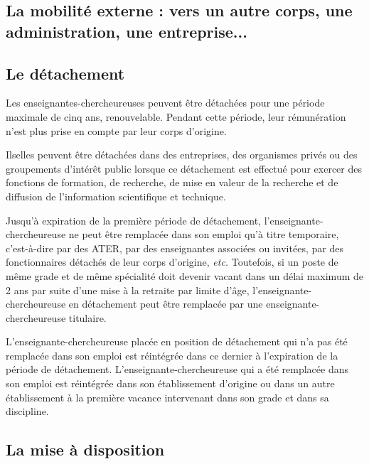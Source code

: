 \subsection{La mobilit\'e externe : vers un autre corps, une administration, une entreprise...}

\subsection*{Le d\'etachement}

Les enseignant\mp e\mp s-chercheur\mp euse\mp s peuvent \^etre d\'etach\'e\mp e\mp s pour une
p\'eriode maximale de cinq ans, renouvelable. Pendant cette p\'eriode, leur r\'emun\'eration n'est plus prise en compte par
leur corps d'origine.

Ils\mp elles peuvent \^etre d\'etach\'e\mp e\mp s dans des entreprises, des organismes
priv\'es ou des groupements d'int\'er\^et public lorsque ce
d\'etachement est effectu\'e pour exercer des fonctions de
formation, de recherche, de mise en valeur de la recherche et de
diffusion de l'information scientifique et technique.

Jusqu'\`a expiration de la premi\`ere p\'eriode de d\'etachement,
l'enseignant\mp e-chercheur\mp euse ne peut \^etre remplac\'e\mp e dans son emploi
qu'\`a titre temporaire, c'est-\`a-dire par des ATER, par des
enseignant\mp e\mp s associ\'e\mp e\mp s ou invit\'e\mp e\mp s, par des fonctionnaires
d\'etach\'es de leur corps d'origine, {\em etc.} Toutefois, si un
poste de m\^eme grade et de m\^eme sp\'ecialit\'e doit devenir
vacant dans un d\'elai maximum de 2 ans par suite d'une mise \`a
la retraite par limite d'\^age, l'enseignant\mp e-chercheur\mp euse en
d\'etachement peut \^etre remplac\'e\mp e par un\mp e enseignant\mp e-chercheur\mp euse
titulaire.

L'enseignant\mp e-chercheur\mp euse plac\'e\mp e en position de d\'etachement qui n'a pas
\'et\'e remplac\'e\mp e dans son emploi est r\'eint\'egr\'e\mp e dans ce dernier
\`a l'expiration de la p\'eriode de d\'etachement.
L'enseignant\mp e-chercheur\mp euse qui a \'et\'e remplac\'e\mp e dans son emploi est
r\'eint\'egr\'e\mp e dans son \'etablissement d'origine ou dans un autre
\'etablissement \`a la premi\`ere vacance intervenant dans son grade et
dans sa discipline.

\subsection*{La mise \`a disposition}

